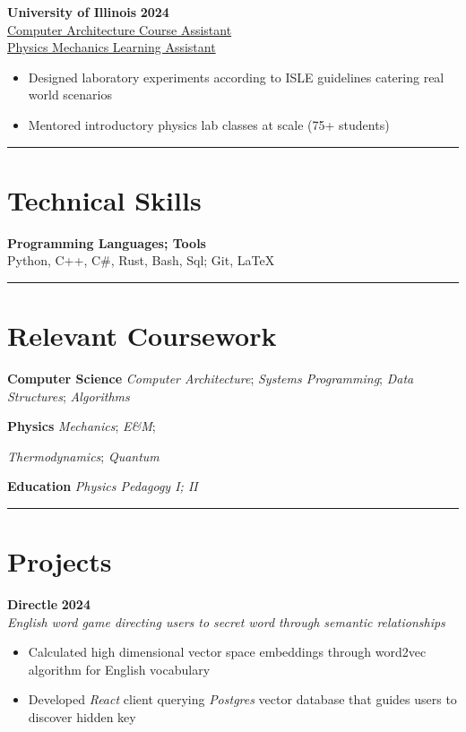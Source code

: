 \documentclass[11pt]{article}
\begin{document}
\textbf{University of Illinois} \hfill \textbf{2024} \\
\underline{Computer Architecture Course Assistant} \\
\underline{Physics Mechanics Learning Assistant}
\begin{itemize}
	\cramped
	\item Designed laboratory experiments according to ISLE guidelines catering real world scenarios
    \item Mentored introductory physics lab classes at scale (75+ students)
\end{itemize}

\rule{\textwidth}{0.1pt}
\vspace*{-10mm}

\section*{Technical Skills}
\vspace*{-1mm}

\textbf{Programming Languages; Tools} \\
Python, C++, C\#, Rust, Bash, Sql; Git, \LaTeX \\

\vspace*{-5mm}
\rule{\textwidth}{0.1pt}
\vspace*{-10mm}

\section*{Relevant Coursework}
\vspace*{-1mm}

\textbf{Computer Science}
\emph{Computer Architecture};
\emph{Systems Programming};
\emph{Data Structures};
\emph{Algorithms}

\textbf{Physics}
\emph{Mechanics};
\emph{E\&M};

\emph{Thermodynamics};
\emph{Quantum}


\textbf{Education}
\emph{Physics Pedagogy I; II}

\rule{\textwidth}{0.1pt}
\vspace*{-10mm}

\section*{Projects}
\vspace*{-1mm}

\textbf{Directle} \hfill \textbf{2024} \\
\emph{English word game directing users to secret word through semantic relationships}
\begin{itemize}
	\cramped
    \item Calculated high dimensional vector space embeddings through word2vec algorithm for English vocabulary
    \item Developed \emph{React} client querying \emph{Postgres} vector database that guides users to discover hidden key
\end{itemize}
\end{document}
